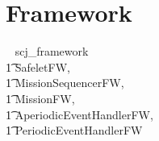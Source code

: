 \section{Framework}
\vspace{-0.75em}

\begin{zsection}
  \SECTION ~ scj\_framework ~ \parents\\
  \t1 SafeletFW,\\
  \t1 MissionSequencerFW,\\
  \t1 MissionFW,\\
  \t1 AperiodicEventHandlerFW,\\
  \t1 PeriodicEventHandlerFW
\end{zsection}
